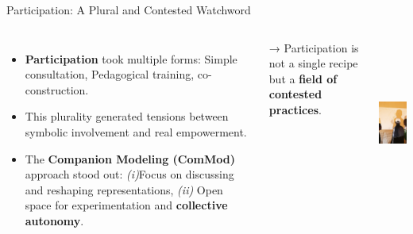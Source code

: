 \documentclass[newPxFont]{beamer}
\begin{document}
\begin{frame}[c]{Participation: A Plural and Contested Watchword}
  \vspace{-0.7cm}
  \begin{columns}[onlytextwidth,T]
    \column{\dimexpr\linewidth-30mm-5mm}

    \begin{itemize}
      \item \textbf{Participation} took multiple forms:  Simple consultation, Pedagogical training, co-construction.  
      \item This plurality generated tensions between symbolic involvement and real empowerment.  
      \item The \textbf{Companion Modeling (ComMod)} approach stood out:  \textit{(i)}Focus on discussing and reshaping representations, \textit{(ii)} Open space for experimentation and \textbf{collective autonomy}.  
    \end{itemize}

    → Participation is not a single recipe but a \textbf{field of contested practices}.

    \column{30mm}
    \includegraphics[height=5.5cm]{img/participation_mbane}
  \end{columns}
\end{frame}
\end{document}
